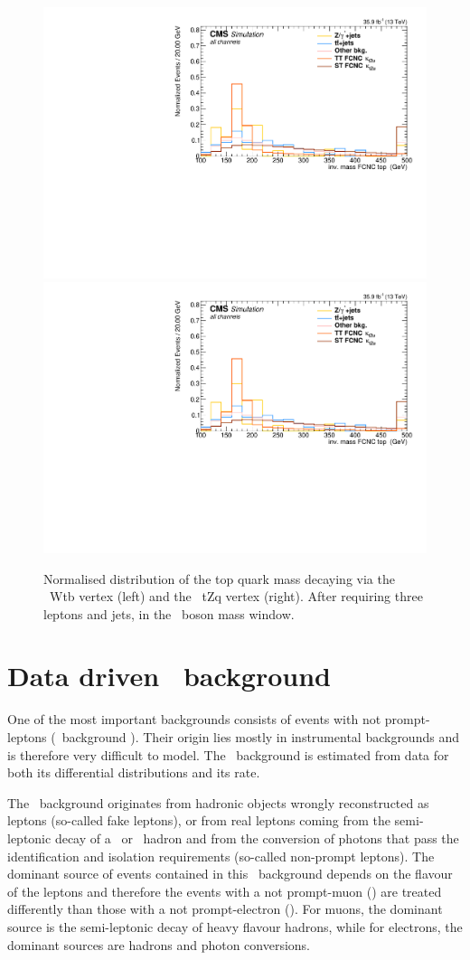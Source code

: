 \begin{figure}[tbph]
	\centering
	\includegraphics[width=0.49\linewidth]{5_EventSelection/Figures/3lepcontrol_dilep_FCNCTopMass_all_Normalizedkappa}
	\includegraphics[width=0.49\linewidth]{5_EventSelection/Figures/3lepcontrol_dilep_FCNCTopMass_all_Normalizedkappa}
	\caption{Normalised distribution of the top quark mass decaying via the \SM\ Wtb vertex (left) and the \FCNC\ tZq vertex (right). After requiring three leptons and jets, in the \PZ\ boson mass window.}
	\label{fig:topmass}
\end{figure}
 
\section{Data driven \NPL\ background}
\label{sec:NPL}
 One of the most important backgrounds consists of events with not prompt-leptons (\NPL\ background ). Their origin lies mostly in instrumental backgrounds and is therefore very difficult to model. The \NPL\ background  is estimated from data for both its differential distributions and its rate. 

The \NPL\ background  originates from hadronic objects wrongly reconstructed as leptons (so-called fake leptons), or from real leptons coming from the semi-leptonic decay of a \Pbottom\ or \Pcharm\ hadron and from the conversion of photons that pass the identification and isolation requirements (so-called non-prompt leptons). The dominant source of events contained in this \NPL\ background  depends on the flavour of the leptons and therefore the events with a not prompt-muon (\NPM) are treated differently than those with a not prompt-electron (\NPE). For muons, the dominant source is the semi-leptonic decay of heavy flavour hadrons, while for electrons, the dominant sources are hadrons and photon conversions. 

